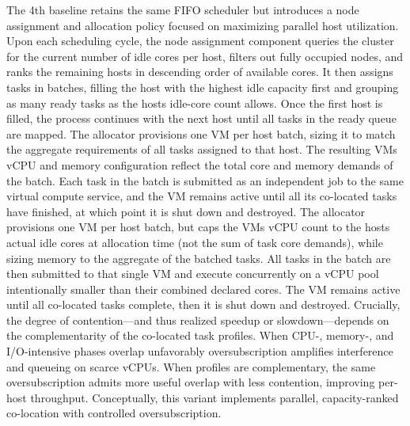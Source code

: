 The 4th baseline retains the same FIFO scheduler but introduces a node assignment and allocation policy focused on maximizing parallel host utilization. Upon each scheduling cycle, the node assignment component queries the cluster for the current number of idle cores per host, filters out fully occupied nodes, and ranks the remaining hosts in descending order of available cores. It then assigns tasks in batches, filling the host with the highest idle capacity first and grouping as many ready tasks as the hosts idle-core count allows. Once the first host is filled, the process continues with the next host until all tasks in the ready queue are mapped.
The allocator provisions one VM per host batch, sizing it to match the aggregate requirements of all tasks assigned to that host. The resulting VMs vCPU and memory configuration reflect the total core and memory demands of the batch. Each task in the batch is submitted as an independent job to the same virtual compute service, and the VM remains active until all its co-located tasks have finished, at which point it is shut down and destroyed.
The allocator provisions one VM per host batch, but caps the VMs vCPU count to the hosts actual idle cores at allocation time (not the sum of task core demands), while sizing memory to the aggregate of the batched tasks. All tasks in the batch are then submitted to that single VM and execute concurrently on a vCPU pool intentionally smaller than their combined declared cores. The VM remains active until all co-located tasks complete, then it is shut down and destroyed.
Crucially, the degree of contention—and thus realized speedup or slowdown—depends on the complementarity of the co-located task profiles. When CPU-, memory-, and I/O-intensive phases overlap unfavorably oversubscription amplifies interference and queueing on scarce vCPUs. When profiles are complementary, the same oversubscription admits more useful overlap with less contention, improving per-host throughput. Conceptually, this variant implements parallel, capacity-ranked co-location with controlled oversubscription.

